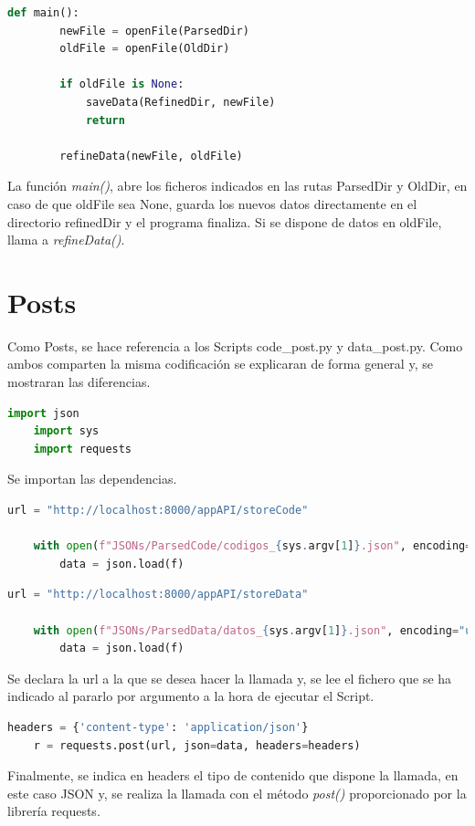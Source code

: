 \begin{lstlisting}[language=Python, caption={Declaración rutas JSONs}]
	def main():
		newFile = openFile(ParsedDir)
		oldFile = openFile(OldDir)
		
		if oldFile is None:
			saveData(RefinedDir, newFile)
			return
		
		refineData(newFile, oldFile)
\end{lstlisting}

La función \textit{main()}, abre los ficheros indicados en las rutas ParsedDir y OldDir, en caso de que oldFile sea None, guarda los nuevos datos directamente en el directorio refinedDir y el programa finaliza. Si se dispone de datos en oldFile, llama a \textit{refineData()}.

\section{Posts}
Como Posts, se hace referencia a los Scripts code\_post.py y data\_post.py. Como ambos comparten la misma codificación se explicaran de forma general y, se mostraran las diferencias.

\begin{lstlisting}[language=Python, caption={Import necesarios post}]
	import json
	import sys
	import requests
\end{lstlisting}

Se importan las dependencias.

\begin{lstlisting}[language=Python, caption={Declaración variables code\_post.py}]
	url = "http://localhost:8000/appAPI/storeCode"
	
	with open(f"JSONs/ParsedCode/codigos_{sys.argv[1]}.json", encoding="utf-8") as f:
		data = json.load(f)
\end{lstlisting}

\begin{lstlisting}[language=Python, caption={Declaración variables data\_post.py}]
	url = "http://localhost:8000/appAPI/storeData"
	
	with open(f"JSONs/ParsedData/datos_{sys.argv[1]}.json", encoding="utf-8") as f:
		data = json.load(f)
\end{lstlisting}

Se declara la url a la que se desea hacer la llamada y, se lee el fichero que se ha indicado al pararlo por argumento a la hora de ejecutar el Script.

\begin{lstlisting}[language=Python, caption={Llamada POST}]
	headers = {'content-type': 'application/json'}
	r = requests.post(url, json=data, headers=headers)
\end{lstlisting}

Finalmente, se indica en headers el tipo de contenido que dispone la llamada, en este caso JSON y, se realiza la llamada con el método \textit{post()} proporcionado por la librería requests.